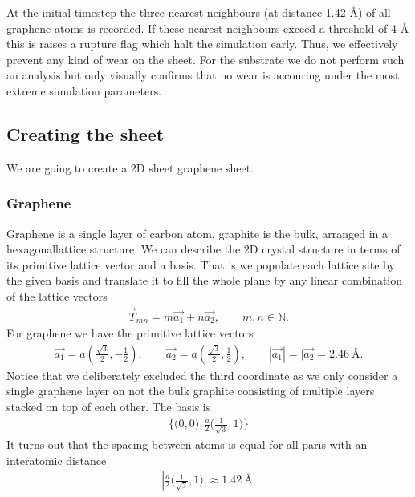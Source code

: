 At the initial timestep the three nearest neighbours (at distance 1.42 Å) of all graphene atoms is recorded. If these nearest neighbours exceed a threshold of 4 Å this is raises a rupture flag which halt the simulation early. Thus, we effectively prevent any kind of wear on the sheet. For the substrate we do not perform such an analysis but only visually confirms that no wear is accouring under the most extreme simulation parameters. 

\subsection{Creating the sheet}

We are going to create a 2D sheet graphene sheet. 

\subsubsection{Graphene}

Graphene is a single layer of carbon atom, graphite is the bulk, arranged in a
hexagonallattice structure. We can describe the 2D crystal structure in terms of
its primitive lattice vector and a basis. That is we populate each lattice site
by the given basis and translate it to fill the whole plane by any linear
combination of the lattice vectors
\begin{align*}
  \vec{T}_{mn} = m\vec{a_1} + n\vec{a_2}, \qquad m,n \in \mathbb{N}.
\end{align*}
For graphene we have the primitive lattice vectors 
\begin{align*}
  \vec{a_1} = a \left(\frac{\sqrt{3}}{2}, -\frac{1}{2}\right), \qquad \vec{a_2} = a \left(\frac{\sqrt{3}}{2}, \frac{1}{2}\right), \qquad |\vec{a_1}| = |\vec{a_2} = 2.46 \ \text{Å}.
\end{align*}
Notice that we deliberately excluded the third coordinate as we only consider a
single graphene layer on not the bulk graphite consisting of multiple layers
stacked on top of each other. The basis is 
\begin{align*}
  \Big\{\Big(0,0\Big), \frac{a}{2}\Big(\frac{1}{\sqrt{3}}, 1 \Big) \Big\}
\end{align*}
It turns out that the spacing between atoms is equal for all paris with an
interatomic distance 
\begin{align*}
  \left|\frac{a}{2}\Big(\frac{1}{\sqrt{3}}, 1 \Big)\right| \approx 1.42 \ \text{Å}.
\end{align*}


